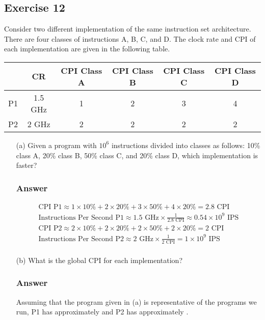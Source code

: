 \documentclass[12pt]{article}
\begin{document}
\subsection*{Exercise 12}
Consider two different implementation of the same instruction set architecture. There are four classes of instructions A, B, C, and D. The clock rate and CPI of each implementation are given in the following table.
\begin{center}
\begin{tabular}{| c | c | c | c | c | c |}
\hline
& CR & CPI Class A & CPI Class B & CPI Class C & CPI Class D \\
\hline
P1 & 1.5 GHz & 1 & 2 & 3 & 4 \\
\hline
P2 & 2 GHz & 2 & 2 & 2 & 2 \\
\hline
\end{tabular}
\end{center}
\begin{itemize}
\item[(a)] Given a program with $10^6$ instructions divided into classes as follows: 10\% class A, 20\% class B, 50\% class C, and 20\% class D, which implementation is faster?
\subsubsection*{Answer}
\begin{align*}
\text{CPI P1} \approx 1 \times 10\% + 2 \times 20\% + 3 \times 50\% + 4 \times 20\% = 2.8\text{ CPI} \\
\text{Instructions Per Second P1} \approx 1.5\text{ GHz} \times \frac{1}{2.8\text{ CPI}} \approx 0.54 \times 10^9\text{ IPS} \\
\text{CPI P2} \approx 2 \times 10\% + 2 \times 20\% + 2 \times 50\% + 2 \times 20\% = 2\text{ CPI} \\
\text{Instructions Per Second P2} \approx 2\text{ GHz} \times \frac{1}{2\text{ CPI}} = 1 \times 10^9\text{ IPS} \\
\end{align*}
\item[(b)] What is the global CPI for each implementation?
\subsubsection*{Answer}
Assuming that the program given in (a) is representative of the programs we run, P1 has approximately  and P2 has approximately .
\end{itemize}
\end{document}
